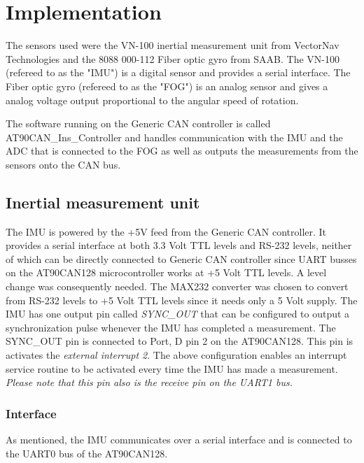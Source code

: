 
\section{Implementation}\label{sec:implementation}
The sensors used were the VN-100 inertial measurement unit from VectorNav Technologies and the 8088 000-112 Fiber optic gyro from SAAB. The VN-100 (refereed to as the "IMU") is a digital sensor and provides a serial interface. The Fiber optic gyro (refereed to as the "FOG") is an analog sensor and gives a analog voltage output proportional to the angular speed of rotation. 

The software running on the Generic CAN controller is called AT90CAN\_Ins\_Controller and handles communication with the IMU and the ADC that is connected to the FOG as well as outputs the measurements from the sensors onto the CAN bus.

\subsection{Inertial measurement unit}
The IMU is powered by the +5V feed from the Generic CAN controller. It provides a serial interface at both 3.3 Volt TTL levels and RS-232 levels, neither of which can be directly connected to Generic CAN controller since UART busses on the AT90CAN128 microcontroller works at +5 Volt TTL levels. A level change was consequently needed. The MAX232 converter was chosen to convert from RS-232 levels to +5 Volt TTL levels since it needs only a 5 Volt supply. \newline
The IMU has one output pin called \emph{SYNC\_OUT} that can be configured to output a synchronization pulse whenever the IMU has completed a measurement. The SYNC\_OUT pin is connected to Port, D pin 2 on the AT90CAN128. This pin is activates the \emph{external interrupt 2}. \newline
The above configuration enables an interrupt service routine to be activated every time the IMU has made a measurement.\newline 
\emph{Please note that this pin also is the receive pin on the UART1 bus.} 

\subsubsection{Interface}
As mentioned, the IMU communicates over a serial interface and is connected to the UART0 bus of the AT90CAN128. 



